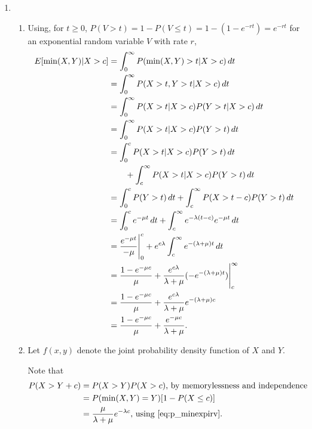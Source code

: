 \documentclass{article}
\begin{document}
\begin{enumerate}
\item
    \begin{enumerate}
    \item
        Using, for $t \geq 0$, $P(V>t)=1-P(V\leq t)=1-(1-e^{-rt})=e^{-rt}$ for an exponential random variable $V$ with rate $r$,
        \begin{equation*}\begin{split}
        E[\min(X,Y)|X>c]    & = \int_0^\infty P(\min(X,Y) > t | X>c)\, dt \\
                            & = \int_0^\infty P(X>t, Y>t|X>c)\, dt \\
                            & = \int_0^\infty P(X>t|X>c) P(Y>t|X>c)\, dt \\
                            & = \int_0^\infty P(X>t|X>c) P(Y>t)\, dt \\
                            & = \int_0^c P(X>t|X>c) P(Y>t)\, dt \\
                            & \qquad + \int_c^\infty P(X>t|X>c) P(Y>t)\, dt \\
                            & = \int_0^c P(Y>t)\, dt + \int_c^\infty P(X>t-c) P(Y>t)\, dt \\
                            & = \int_0^c e^{-\mu t}\, dt + \int_c^\infty e^{-\lambda(t-c)}e^{-\mu t}\, dt \\
                            & = \frac{e^{-\mu t}}{-\mu}\Bigg|_0^c + e^{c\lambda}\int_c^\infty e^{-(\lambda + \mu)t}\, dt \\
                            & = \frac{1-e^{-\mu c}}{\mu} + \frac{e^{c\lambda}}{\lambda+\mu} (-e^{-(\lambda+\mu)t})\Bigg|_c^\infty \\
                            & = \frac{1-e^{-\mu c}}{\mu} + \frac{e^{c\lambda}}{\lambda+\mu}e^{-(\lambda+\mu)c} \\
                            & = \frac{1-e^{-\mu c}}{\mu} + \frac{e^{-\mu c}}{\lambda+\mu}\text. \\
        \end{split}\end{equation*}
    \item
        Let $f(x,y)$ denote the joint probability density function of $X$ and $Y$.

        Note that
        \begin{equation*}\begin{split}
        P(X>Y+c)    & = P(X>Y)P(X>c) \text{, by memorylessness and independence} \\
                    & = P(\min(X,Y)=Y)[1-P(X\leq c)] \\
                    & = \frac{\mu}{\lambda+\mu}e^{-\lambda c} \text{, using \eqref{eq:p_minexpirv}}\text. \\
        \end{split}\end{equation*}


\end{enumerate}
\end{enumerate}
\end{document}
